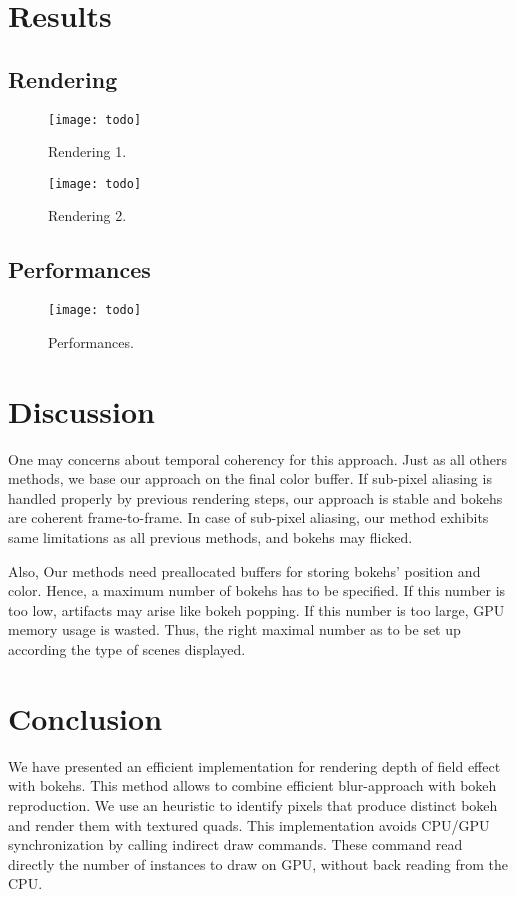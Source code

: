 \section{Results}

\subsection{Rendering}
	\begin{figure}[htb]\centering
	\texttt{[image: todo]}
	\caption{Rendering 1.}
	\label{YourName:fig1}
	\end{figure}

	\begin{figure}[htb]\centering
	\texttt{[image: todo]}
	\caption{Rendering 2.}
	\label{YourName:fig1}
	\end{figure}

\subsection{Performances}
	\begin{figure}[htb]\centering
	\texttt{[image: todo]}
	\caption{Performances.}
	\label{YourName:fig1}
	\end{figure}

\section{Discussion}
One may concerns about temporal coherency for this approach. Just as all others methods, we base our approach on the final color buffer. If sub-pixel aliasing is handled properly by previous rendering steps, our approach is stable and bokehs are coherent frame-to-frame. In case of sub-pixel aliasing, our method exhibits same limitations as all previous methods, and bokehs may flicked.

Also, Our methods need preallocated buffers for storing bokehs' position and color. Hence, a maximum number of bokehs has to be specified. If this number is too low, artifacts may arise like bokeh popping. If this number is too large, GPU memory usage is wasted. Thus, the right maximal number as to be set up according the type of scenes displayed.

\section{Conclusion}
We have presented an efficient implementation for rendering depth of field effect with bokehs. This method allows to combine efficient blur-approach with bokeh reproduction. We use an heuristic to identify pixels that produce distinct bokeh and render them with textured quads. This implementation avoids CPU/GPU synchronization by calling indirect draw commands. These command read directly the number of instances to draw on GPU, without back reading from the CPU.


